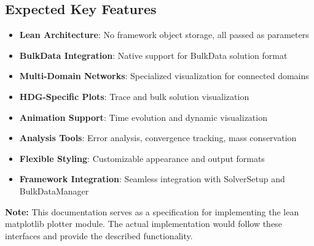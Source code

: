 \subsection{Expected Key Features}

\begin{itemize}
    \item \textbf{Lean Architecture}: No framework object storage, all passed as parameters
    \item \textbf{BulkData Integration}: Native support for BulkData solution format
    \item \textbf{Multi-Domain Networks}: Specialized visualization for connected domains
    \item \textbf{HDG-Specific Plots}: Trace and bulk solution visualization
    \item \textbf{Animation Support}: Time evolution and dynamic visualization
    \item \textbf{Analysis Tools}: Error analysis, convergence tracking, mass conservation
    \item \textbf{Flexible Styling}: Customizable appearance and output formats
    \item \textbf{Framework Integration}: Seamless integration with SolverSetup and BulkDataManager
\end{itemize}

\textbf{Note:} This documentation serves as a specification for implementing the lean matplotlib plotter module. The actual implementation would follow these interfaces and provide the described functionality.

